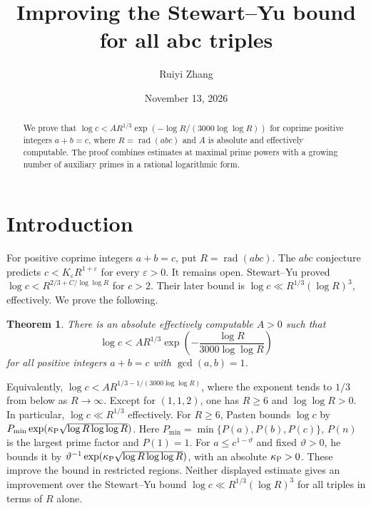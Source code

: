 \documentclass{amsart}
\title{Improving the Stewart--Yu bound for all abc triples}
\author{Ruiyi Zhang}
\date{November 13, 2026}
\newtheorem{theorem}{Theorem}
\theoremstyle{remark}
\newcommand{\rad}{\operatorname{rad}}
\newcommand{\eps}{\varepsilon}
\numberwithin{equation}{section}
\begin{document}
\begin{abstract}
We prove that $\log c<A R^{1/3}\exp(-\log R/(3000\log\log R))$
for coprime positive integers $a+b=c$, where $R=\operatorname{rad}(abc)$
and $A$ is absolute and effectively computable.
The proof combines estimates at maximal prime powers with a growing number
of auxiliary primes in a rational logarithmic form.
\end{abstract}
\maketitle

\section{Introduction}
For positive coprime integers $a+b=c$, put $R=\rad(abc)$.
The $abc$ conjecture predicts $c<K_\eps R^{1+\eps}$ for every $\eps>0$.
It remains open.
Stewart--Yu \cite[p.~226]{SY1991} proved
$\log c<R^{2/3+C/\log\log R}$ for $c>2$.
Their later bound \cite[Theorem~1, p.~170]{SY2001} is
$\log c\ll R^{1/3}(\log R)^3$, effectively.
We prove the following.

\begin{theorem}\label{thm:main}
There is an absolute effectively computable $A>0$ such that
\begin{equation}\label{eq:main}
\log c<A R^{1/3}\exp\!\left(-\frac{\log R}{3000\log\log R}\right)
\end{equation}
for all positive integers $a+b=c$ with $\gcd(a,b)=1$.
\end{theorem}
Equivalently, $\log c<A R^{1/3-1/(3000\log\log R)}$, where the exponent tends to $1/3$ from below as $R\to\infty$.
Except for $(1,1,2)$, one has $R\ge6$ and $\log\log R>0$.
In particular, $\log c\ll R^{1/3}$ effectively.
For $R\ge6$, Pasten \cite[Theorem~1.4]{Pasten2023arXiv} bounds $\log c$ by
$P_{\min}\exp(\kappa_{\rm P}\sqrt{\log R\log\log R})$.
Here $P_{\min}=\min\{P(a),P(b),P(c)\}$, $P(n)$ is the largest prime factor and $P(1)=1$.
For $a\le c^{1-\vartheta}$ and fixed $\vartheta>0$, he bounds it by
$\vartheta^{-1}\exp(\kappa_{\rm P}\sqrt{\log R\log\log R})$,
with an absolute $\kappa_{\rm P}>0$.
These improve the bound in restricted regions.
Neither displayed estimate gives an improvement over the Stewart--Yu bound $\log c\ll R^{1/3}(\log R)^3$ for all triples in terms of $R$ alone.
\end{document}
